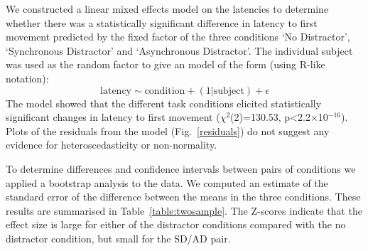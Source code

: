 \documentclass[10pt,letterpaper]{article}
\begin{document}
We constructed a linear mixed effects model on the latencies to
determine whether there was a statistically significant difference in
latency to first movement predicted by the fixed factor of the three
conditions `No Distractor', `Synchronous Distractor' and `Asynchronous
Distractor'. The individual subject was used as the random factor to
give an model of the form (using R-like notation):
\begin{equation}\label{eq:linear_mixed_effects_model}
\text{latency} \sim \text{condition} + (1|\text{subject}) + \epsilon
\end{equation}
%
%
The model showed that the different task conditions elicited
statistically significant changes in latency to first movement
($\chi^2$(2)=130.53, p\textless2.2$\times$10$^{-16}$). Plots of the
residuals from the model (Fig.~\ref{residuals}) do not suggest any
evidence for heteroscedasticity or non-normality.

To determine differences and confidence intervals between pairs of
conditions we applied a bootstrap analysis to the data. We computed an
estimate of the standard error of the difference between the means in
the three conditions. These results are summarised in
Table~\ref{table:twosample}. The Z-scores indicate that the effect
size is large for either of the distractor conditions compared with
the no distractor condition, but small for the SD/AD pair.
\end{document}
